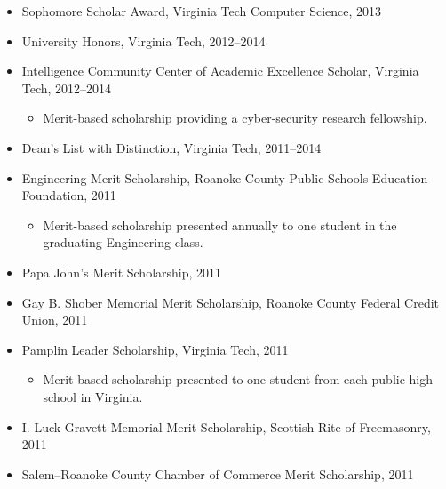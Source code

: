 \documentclass[letter]{article}
\begin{document}
\begin{minipage}{\textwidth}
\begin{itemize}
    
      \item Sophomore Scholar Award, Virginia Tech Computer Science, 2013
      
    
      \item University Honors, Virginia Tech, 2012--2014
      
    
      \item Intelligence Community Center of Academic Excellence Scholar, Virginia Tech, 2012--2014
      
        \begin{itemize}
          \item Merit-based scholarship providing a cyber-security research fellowship.
        \end{itemize}
      
    
      \item Dean's List with Distinction, Virginia Tech, 2011--2014
      
    
      \item Engineering Merit Scholarship, Roanoke County Public Schools Education Foundation, 2011
      
        \begin{itemize}
          \item Merit-based scholarship presented annually to one student in the graduating Engineering class.
        \end{itemize}
      
    
      \item Papa John's Merit Scholarship, 2011
      
    
      \item Gay B. Shober Memorial Merit Scholarship, Roanoke County Federal Credit Union, 2011
      
    
      \item Pamplin Leader Scholarship, Virginia Tech, 2011
      
        \begin{itemize}
          \item Merit-based scholarship presented to one student from each public high school in Virginia.
        \end{itemize}
      
    
      \item I. Luck Gravett Memorial Merit Scholarship, Scottish Rite of Freemasonry, 2011
      
    
      \item Salem--Roanoke County Chamber of Commerce Merit Scholarship, 2011
      
    
  \end{itemize}
  \bigskip

\end{minipage}\medskip
\end{document}
